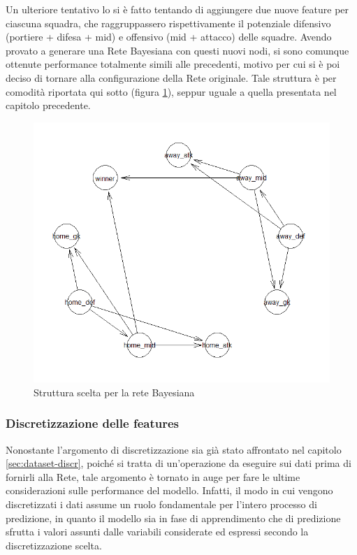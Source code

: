 \documentclass[hidelinks, 12pt]{article}
\begin{document}
\vspace{3ex}

Un ulteriore tentativo lo si è fatto tentando di aggiungere due nuove feature per ciascuna squadra, che raggruppassero rispettivamente il potenziale difensivo (portiere + difesa + mid) e offensivo (mid + attacco) delle squadre. Avendo provato a generare una Rete Bayesiana con questi nuovi nodi, si sono comunque ottenute performance totalmente simili alle precedenti, motivo per cui si è poi deciso di tornare alla configurazione della Rete originale. Tale struttura è per comodità riportata qui sotto (figura \ref{img:hc-bin-bl_2}), seppur uguale a quella presentata nel capitolo precedente.

\begin{figure}[H]
	\centering
	\includegraphics[scale=0.6]{images/05_02_hc_bin_bl.png}
	\caption[Struttura scelta per la rete Bayesiana]{Struttura scelta per la rete Bayesiana}
	\label{img:hc-bin-bl_2}
\end{figure}


\subsubsection{Discretizzazione delle features}
\label{sec:perf-discret}

Nonostante l'argomento di discretizzazione sia già stato affrontato nel capitolo \ref{sec:dataset-discr}, poiché si tratta di un'operazione da eseguire sui dati prima di fornirli alla Rete, tale argomento è tornato in auge per fare le ultime considerazioni sulle performance del modello. Infatti, il modo in cui vengono discretizzati i dati assume un ruolo fondamentale per l'intero processo di predizione, in quanto il modello sia in fase di apprendimento che di predizione sfrutta i valori assunti dalle variabili considerate ed espressi secondo la discretizzazione scelta.
\end{document}
